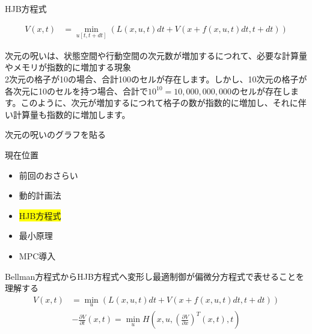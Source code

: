 \documentclass[dvipdfmx,12pt]{beamer}
\begin{document}
    \begin{frame}{HJB方程式}
        \footnotesize
        \begin{tcolorbox}[title=Bellman方程式]
            \begin{align*}
                V(x, t) &= \min_{u[t, t+dt]} \left( L(x, u, t) dt + V \left( x + f(x, u, t) dt, t + dt \right) \right)
            \end{align*}
        \end{tcolorbox}
        \begin{tcolorbox}[title=次元の呪い]
            次元の呪いは、状態空間や行動空間の次元数が増加するにつれて、必要な計算量やメモリが指数的に増加する現象 \\
            2次元の格子が10の場合、合計100のセルが存在します。しかし、10次元の格子が各次元に10のセルを持つ場合、合計で$10^10 = 10,000,000,000$のセルが存在します。このように、次元が増加するにつれて格子の数が指数的に増加し、それに伴い計算量も指数的に増加します。
        \end{tcolorbox}
        次元の呪いのグラフを貼る \\
        \centering
    \end{frame}

    \begin{frame}{現在位置}
        \footnotesize
        \begin{itemize}
            \item 前回のおさらい
            \item 動的計画法
            \item \colorbox{yellow}{HJB方程式}
            \item 最小原理
            \item MPC導入
        \end{itemize}
        Bellman方程式からHJB方程式へ変形し最適制御が偏微分方程式で表せることを理解する\\
        \begin{align*}
            V(x, t) &= \min_u \left( L(x, u, t) dt + V \left( x + f(x, u, t) dt, t + dt \right) \right)        
        \end{align*}
        \begin{align*}
            -\frac{\partial V}{\partial t}\left(x,t\right) = \min _u H\left(x, u, \left( \frac{\partial V}{\partial x} \right)^T\left(x, t\right), t \right)
        \end{align*}
    \end{frame}
\end{document}
